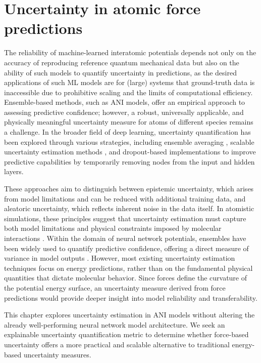 \chapter{Uncertainty in atomic force predictions}
\label{chapter3}

The reliability of machine-learned interatomic potentials depends not only on the accuracy of reproducing reference quantum mechanical data but also on the ability of such models to quantify uncertainty in predictions, as the desired applications of such ML models are for (large) systems that ground-truth data is inaccessible due to prohibitive scaling and the limits of computational efficiency.
Ensemble-based methods, such as ANI models, offer an empirical approach to assessing predictive confidence; however, a robust, universally applicable, and physically meaningful uncertainty measure for atoms of different species remains a challenge.
In the broader field of deep learning, uncertainty quantification has been explored through various strategies, including ensemble averaging \cite{optimal_ensemble_averaging_naftaly, ensemble_deep_learning_review_ganaie}, scalable uncertainty estimation methods \cite{scalable_uncertainty_scalia, scalable_uncertainty_lakshminarayanan}, and dropout-based implementations \cite{dropout1, dropout2, uncertainty_quantification_dropout_wen} to improve predictive capabilities by temporarily removing nodes from the input and hidden layers. 

These approaches aim to distinguish between epistemic uncertainty, which arises from model limitations and can be reduced with additional training data, and aleatoric uncertainty, which reflects inherent noise in the data itself. 
In atomistic simulations, these principles suggest that uncertainty estimation must capture both model limitations and physical constraints imposed by molecular interactions \cite{uncertainty_atomistic_ml_peterson}.
Within the domain of neural network potentials, ensembles have been widely used to quantify predictive confidence, offering a direct measure of variance in model outputs \cite{uncertainty_of_nnp_ensembles_kahle}. 
However, most existing uncertainty estimation techniques focus on energy predictions, rather than on the fundamental physical quantities that dictate molecular behavior. 
Since forces define the curvature of the potential energy surface, an uncertainty measure derived from force predictions would provide deeper insight into model reliability and transferability.

This chapter explores uncertainty estimation in ANI models without altering the already well-performing neural network model architecture. 
We seek an explainable \cite{uncertainty_quantification_yang} uncertainty quantification metric to determine whether force-based uncertainty offers a more practical and scalable alternative to traditional energy-based uncertainty measures.


